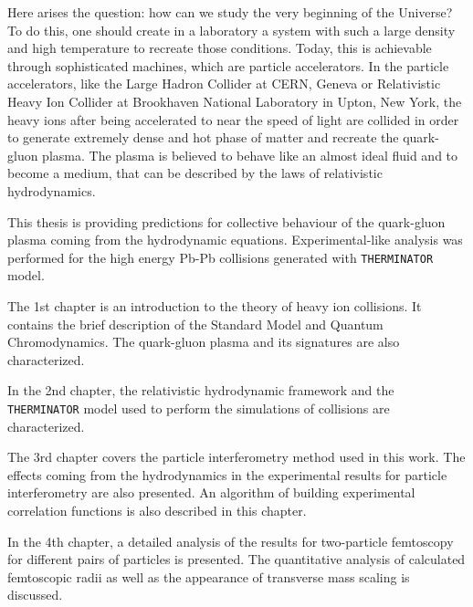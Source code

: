 Here arises the question: how can we study the very beginning of the Universe?
To do this, one should create in a laboratory a system with such a large density and high temperature to recreate those conditions.
Today, this is achievable through sophisticated machines, which are particle accelerators.
In the particle accelerators, like the Large Hadron Collider at CERN, Geneva or Relativistic Heavy Ion Collider at Brookhaven National Laboratory in Upton, New York, the heavy ions after being accelerated to near the speed of light are collided in order to generate extremely dense and hot phase of matter and recreate the quark-gluon plasma.
The plasma is believed to behave like an almost ideal fluid and to become a medium, that can be described by the laws of relativistic hydrodynamics.

This thesis is providing predictions for collective behaviour of the quark-gluon plasma coming from the hydrodynamic equations.
Experimental-like analysis was performed for the high energy Pb-Pb collisions generated with \verb|THERMINATOR| model.

The 1st chapter is an introduction to the theory of heavy ion collisions.
It contains the brief description of the Standard Model and Quantum Chromodynamics.
The quark-gluon plasma and its signatures are also characterized.

In the 2nd chapter, the relativistic hydrodynamic framework and the \verb|THERMINATOR| model used to perform the simulations of collisions are characterized.

The 3rd chapter covers the particle interferometry method used in this work.
The effects coming from the hydrodynamics in the experimental results for particle interferometry are also presented.
An algorithm of building experimental correlation functions is also described in this chapter.

In the 4th chapter, a detailed analysis of the results for two-particle femtoscopy for different pairs of particles is presented.
The quantitative analysis of calculated femtoscopic radii as well as the appearance of transverse mass scaling is discussed.
